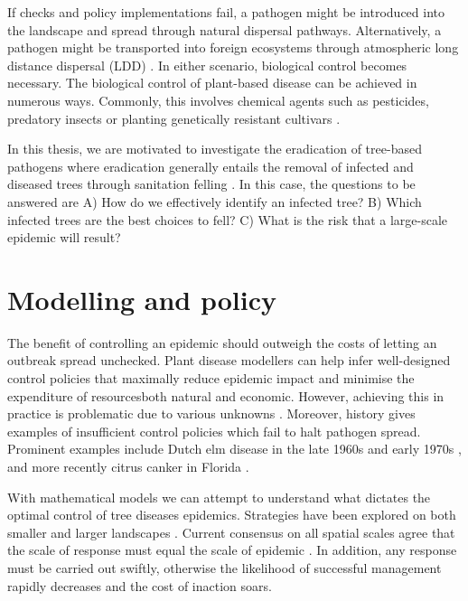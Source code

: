 If checks and policy implementations fail, a pathogen might be introduced into the landscape and spread through natural
dispersal pathways. Alternatively, a pathogen might be transported into foreign ecosystems through atmospheric 
long distance dispersal (LDD) \cite{brown2002aerial}. In either scenario, biological control becomes necessary. 
The biological control of plant-based disease
can be achieved in numerous ways. Commonly, this involves chemical agents such as pesticides, predatory insects or planting
genetically resistant cultivars \cite{pal2006biological, baker1974biological}. 

In this thesis, we are motivated to investigate the eradication of tree-based pathogens 
where eradication generally entails the removal of infected and diseased trees through sanitation felling \cite{pietzsch2021effect}. 
In this case, the questions to be answered are A) How do we effectively identify an infected tree? B) 
Which infected trees are the best choices to fell? C) What is the risk that a large-scale epidemic will result?


\section{Modelling and policy}


The benefit of controlling an epidemic should outweigh the costs of letting an outbreak spread unchecked. 
Plant disease modellers can help infer well-designed control policies that maximally reduce epidemic impact and minimise the expenditure
of resources\textemdash both natural and economic. However, achieving this in practice is problematic due to various unknowns \cite{13-challenges}.
Moreover, history gives examples of insufficient control policies which fail to halt pathogen spread. 
Prominent examples include Dutch elm disease in the late 1960s and early 1970s \cite{dutch-elm-mismanage}, 
and more recently citrus canker in Florida \cite{schubert2001meeting}.

With mathematical models we can attempt to understand what dictates the optimal control of tree diseases epidemics. 
Strategies have been explored on both smaller \cite{WEBIDEMICS, risk-potential-control} 
and larger landscapes \cite{large-scale-control2}. Current consensus on all spatial scales
agree that the scale of response must equal the scale of epidemic \cite{control-scale-matching}. In addition, 
any response must be carried out swiftly, otherwise the likelihood of successful management rapidly decreases and the cost of inaction soars.

